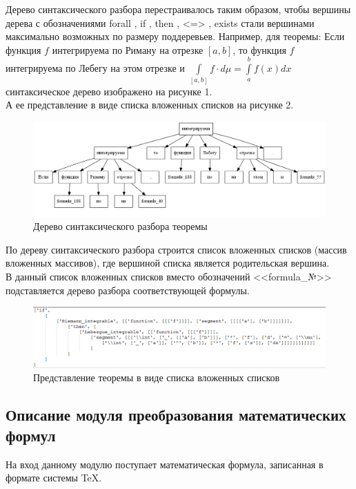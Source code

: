 \documentclass[12pt]{article}
\begin{document}
Дерево синтаксического разбора перестраивалось таким образом, чтобы вершины дерева с обозначениями forall , if , then , <=> , exists стали вершинами максимально возможных по размеру поддеревьев. Например, для теоремы: Если функция ${\displaystyle f}$ интегрируема по Риману на отрезке ${\displaystyle [a,b]}$, то функция ${\displaystyle f}$ интегрируема по Лебегу на этом отрезке и ${\displaystyle \int \limits _{[a,b]} f \cdot d\mu=\int \limits _{a}^{b} f(x) dx}$ синтаксическое дерево изображено на рисунке 1.\\
А ее представление в виде списка вложенных списков на рисунке 2.\\

\begin{figure}
\includegraphics[scale=0.43]{Picture_2.png}
\caption{Дерево синтаксического разбора теоремы }
\end{figure}

По дереву синтаксического разбора строится список вложенных списков (массив вложенных массивов), где вершиной списка является родительская вершина. \\

В данный список вложенных списков  вместо  обозначений <<formula\_№>> подставляется дерево разбора соответствующей формулы. 

\begin{figure}
\includegraphics[scale=0.63]{Picture_3.png}
\caption{Представление теоремы в виде списка вложенных списков }
\end{figure}

\subsection{Описание модуля преобразования математических формул}
На вход данному модулю поступает математическая формула, записанная в формате системы TeX.\\
\end{document}
